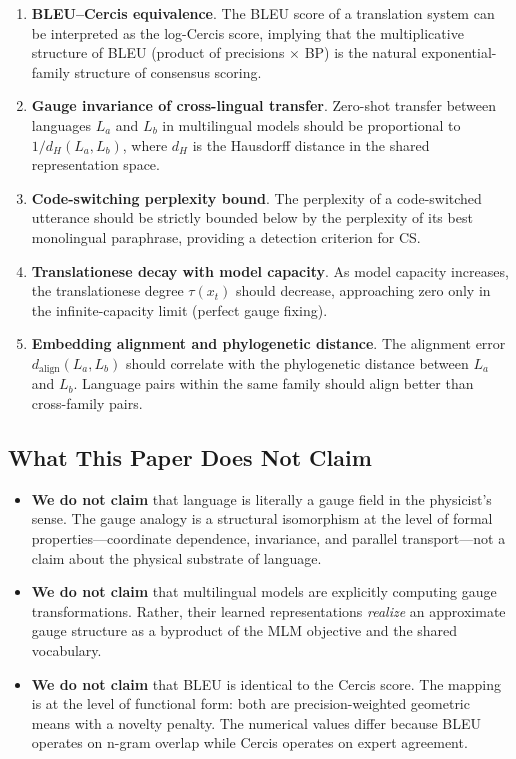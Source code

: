 \documentclass[12pt,a4paper]{article}
\theoremstyle{remark}
\newcommand{\Cercis}{\textsf{Cercis}}
\begin{document}
\begin{enumerate}[leftmargin=*, label=(\arabic*)]
  \item \textbf{BLEU--Cercis equivalence}. The BLEU score of a translation
        system can be interpreted as the log-\Cercis{} score, implying that
        the multiplicative structure of BLEU (product of precisions $\times$ BP)
        is the natural exponential-family structure of consensus scoring.
  \item \textbf{Gauge invariance of cross-lingual transfer}. Zero-shot
        transfer between languages $L_a$ and $L_b$ in multilingual models
        should be proportional to $1 / d_H(L_a, L_b)$, where $d_H$ is the
        Hausdorff distance in the shared representation space.
  \item \textbf{Code-switching perplexity bound}. The perplexity of a
        code-switched utterance should be strictly bounded below by the
        perplexity of its best monolingual paraphrase, providing a
        detection criterion for CS.
  \item \textbf{Translationese decay with model capacity}. As model capacity
        increases, the translationese degree $\tau(x_t)$ should decrease,
        approaching zero only in the infinite-capacity limit (perfect
        gauge fixing).
  \item \textbf{Embedding alignment and phylogenetic distance}. The alignment
        error $d_{\text{align}}(L_a, L_b)$ should correlate with the
        phylogenetic distance between $L_a$ and $L_b$. Language pairs
        within the same family should align better than cross-family pairs.
\end{enumerate}

\subsection{What This Paper Does Not Claim}

\begin{itemize}[leftmargin=*]
  \item \textbf{We do not claim} that language is literally a gauge field
        in the physicist's sense. The gauge analogy is a structural
        isomorphism at the level of formal properties---coordinate
        dependence, invariance, and parallel transport---not a claim
        about the physical substrate of language.
  \item \textbf{We do not claim} that multilingual models are explicitly
        computing gauge transformations. Rather, their learned representations
        \emph{realize} an approximate gauge structure as a byproduct of the
        MLM objective and the shared vocabulary.
  \item \textbf{We do not claim} that BLEU is identical to the \Cercis{}
        score. The mapping is at the level of functional form: both are
        precision-weighted geometric means with a novelty penalty. The
        numerical values differ because BLEU operates on n-gram overlap
        while \Cercis{} operates on expert agreement.
\end{itemize}
\end{document}
